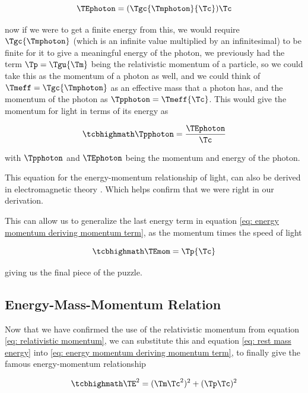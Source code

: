 \begin{equation}
	\TEphoton  = (\Tgc {\Tmphoton  }{\Tc }){\Tc }
\end{equation}

now if we were to get a finite energy from this, we would require $\Tgc {\Tmphoton  }$ (which is an infinite value multiplied by an infinitesimal) to be finite for it to give a meaningful energy of the photon, we previously had the term $\Tp =\Tgu {\Tm }$ being the relativistic momentum of a particle, so we could take this as the momentum of a photon as well, and we could think of $\Tmeff =\Tgc {\Tmphoton  }$ as an effective mass that a photon has, and the momentum of the photon as $\Tpphoton =\Tmeff {\Tc }$.
This would give the momentum for light in terms of its energy as

\begin{equation}
	\mhl{
	 {\Tpphoton  }= \frac{\TEphoton  }{\Tc }
	}
\end{equation}

with $\Tpphoton $ and $\TEphoton $ being the momentum and energy of the photon.

This equation for the energy-momentum relationship of light, can also be derived in electromagnetic theory \cite{FeynmanMomentum}.
Which helps confirm that we were right in our derivation.

This can allow us to generalize the last energy term in equation \eqref{eq: energy momentum deriving momentum term}, as the momentum times the speed of light

\begin{equation}
	\label{eq: energy from momentum}
	\mhl{
		\TEmom  = \Tp  {\Tc }
	}
\end{equation}

giving us the final piece of the puzzle.

\subsection{Energy-Mass-Momentum Relation}\label{subsect: Energy-Mass-Momentum Relation}

Now that we have confirmed the use of the relativistic momentum from equation \eqref{eq: relativistic momentum}, we can substitute this and equation \eqref{eq: rest mass energy} into \eqref{eq: energy momentum deriving momentum term}, to finally give the famous energy-momentum relationship

\begin{equation}
	\label{eq: energy-momentum relation}
	\mhl{
			\TE ^2  = (\Tm \Tc ^2)^2 + (\Tp \Tc )^2
	}
\end{equation}

